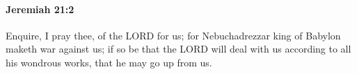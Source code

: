 
		\paragraph{Jeremiah 21:2} %
			\label{JEREMIAH-21-2}

			Enquire, I pray thee, of the LORD for us; for Nebuchadrezzar king of Babylon maketh war against us; if so be that the LORD will deal with us according to all his wondrous works, that he may go up from us.


